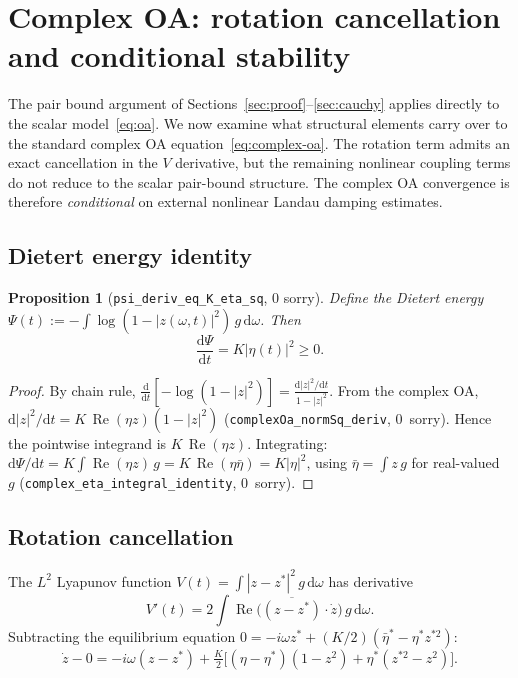 \documentclass[11pt,a4paper]{article}
\newtheorem{proposition}[theorem]{Proposition}
\theoremstyle{definition}
\DeclareMathOperator{\re}{Re}
\begin{document}
\section{Complex OA: rotation cancellation and conditional stability}\label{sec:complex-extension}

The pair bound argument of Sections~\ref{sec:proof}--\ref{sec:cauchy} applies directly to the scalar model~\eqref{eq:oa}. We now examine what structural elements carry over to the standard complex OA equation~\eqref{eq:complex-oa}. The rotation term admits an exact cancellation in the $V$ derivative, but the remaining nonlinear coupling terms do not reduce to the scalar pair-bound structure. The complex OA convergence is therefore \emph{conditional} on external nonlinear Landau damping estimates.

\subsection{Dietert energy identity}

\begin{proposition}[\texttt{psi\_deriv\_eq\_K\_eta\_sq}, 0 sorry]\label{prop:psi}
Define the Dietert energy $\Psi(t) := -\int \log(1-|z(\omega,t)|^2)\,g\,\mathrm{d}\omega$. Then
\[
\frac{\mathrm{d}\Psi}{\mathrm{d}t} = K|\eta(t)|^2 \geq 0.
\]
\end{proposition}
\begin{proof}
By chain rule, $\frac{\mathrm{d}}{\mathrm{d}t}[-\log(1-|z|^2)] = \frac{\mathrm{d}|z|^2/\mathrm{d}t}{1-|z|^2}$. From the complex OA, $\mathrm{d}|z|^2/\mathrm{d}t = K\,\re(\eta z)(1-|z|^2)$ (\texttt{complexOa\_normSq\_deriv}, 0~sorry). Hence the pointwise integrand is $K\,\re(\eta z)$. Integrating: $\mathrm{d}\Psi/\mathrm{d}t = K\int \re(\eta z)\,g = K\,\re(\eta\bar\eta) = K|\eta|^2$, using $\bar\eta = \int z\,g$ for real-valued~$g$ (\texttt{complex\_eta\_integral\_identity}, 0~sorry).
\end{proof}

\subsection{Rotation cancellation}

The $L^2$ Lyapunov function $V(t) = \int |z-z^*|^2\,g\,\mathrm{d}\omega$ has derivative
\[
V'(t) = 2\int \re\bigl(\overline{(z-z^*)}\cdot\dot z\bigr)\,g\,\mathrm{d}\omega.
\]
Subtracting the equilibrium equation $0 = -i\omega z^* + (K/2)(\bar\eta^* - \eta^* z^{*2})$:
\[
\dot z - 0 = -i\omega(z-z^*) + \tfrac{K}{2}\bigl[(\eta-\eta^*)(1-z^2) + \eta^*(z^{*2}-z^2)\bigr].
\]
\end{document}
